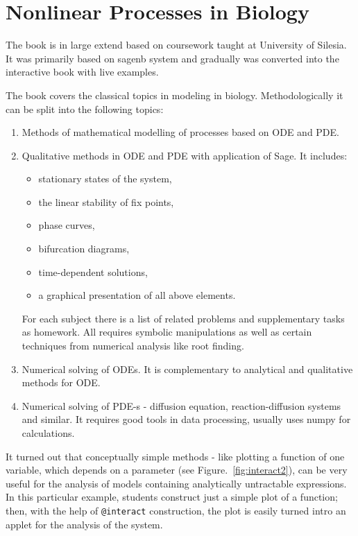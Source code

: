 \documentclass{deliverablereport}
\begin{document}
\section{ Nonlinear Processes in Biology }


The book is in large extend based on coursework taught at University
of Silesia. It was primarily based on sagenb system and gradually was
converted into the interactive book with live examples.


The book covers the classical topics in modeling in
biology. Methodologically it can be split into the following topics:

\begin{enumerate}
\item Methods of mathematical modelling of  processes based on ODE and PDE. 
\item Qualitative methods in ODE and PDE with application of Sage. It
  includes:
  \begin{itemize}
  \item stationary states of the system,
  \item the linear stability of fix points,
  \item phase curves,
  \item bifurcation diagrams,
  \item time-dependent solutions,
  \item a graphical  presentation of all above  elements. 
  \end{itemize}
  
  For each subject there is a list of related problems and
  supplementary tasks as homework. All requires symbolic manipulations
  as well as certain techniques from numerical analysis like root
  finding.
  
\item Numerical solving of ODEs. It is complementary to analytical and
  qualitative methods for ODE. 
\item Numerical solving of PDE-s - diffusion equation,
  reaction-diffusion systems and similar. It requires good tools in data
  processing, usually uses numpy for calculations.

\end{enumerate}


It turned out that conceptually simple methods - like plotting a
function of one variable, which depends on a parameter (see
Figure.~\ref{fig:interact2}), can be very useful for the analysis of
models containing analytically untractable expressions. In this
particular example, students construct just a simple plot of a
function; then, with the help of \texttt{@interact} construction, the
plot is easily turned intro an applet for the analysis of the system.
\end{document}
